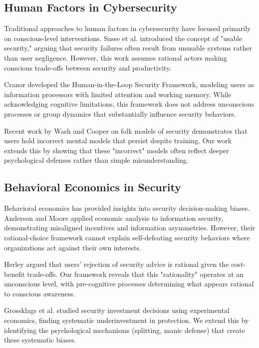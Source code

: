 \documentclass[11pt,a4paper]{article}
\begin{document}
\subsection{Human Factors in Cybersecurity}

Traditional approaches to human factors in cybersecurity have focused primarily on conscious-level interventions. Sasse et al.\cite{sasse2001} introduced the concept of "usable security," arguing that security failures often result from unusable systems rather than user negligence. However, this work assumes rational actors making conscious trade-offs between security and productivity.

Cranor\cite{cranor2008} developed the Human-in-the-Loop Security Framework, modeling users as information processors with limited attention and working memory. While acknowledging cognitive limitations, this framework does not address unconscious processes or group dynamics that substantially influence security behaviors.

Recent work by Wash and Cooper\cite{wash2018} on folk models of security demonstrates that users hold incorrect mental models that persist despite training. Our work extends this by showing that these "incorrect" models often reflect deeper psychological defenses rather than simple misunderstanding.

\subsection{Behavioral Economics in Security}

Behavioral economics has provided insights into security decision-making biases. Anderson and Moore\cite{anderson2006} applied economic analysis to information security, demonstrating misaligned incentives and information asymmetries. However, their rational-choice framework cannot explain self-defeating security behaviors where organizations act against their own interests.

Herley\cite{herley2009} argued that users' rejection of security advice is rational given the cost-benefit trade-offs. Our framework reveals that this "rationality" operates at an unconscious level, with pre-cognitive processes determining what appears rational to conscious awareness.

Grossklags et al.\cite{grossklags2008} studied security investment decisions using experimental economics, finding systematic underinvestment in protection. We extend this by identifying the psychological mechanisms (splitting, manic defense) that create these systematic biases.
\end{document}
